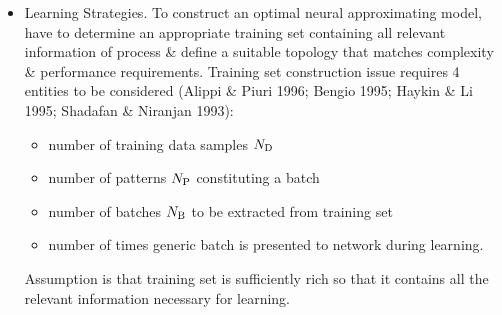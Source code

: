 \documentclass{article}
\begin{document}
\begin{enumerate}
\begin{itemize}
\begin{itemize}
\begin{itemize}
				{\bf Nonlinear transformations of data.} This method to transform data can help when dynamic range of data is too high. In the case, e.g., typically apply log function to input data. Log function is often applied in error \& objective functions for same purposes.
			\end{itemize}
			\item {\sf Learning Strategies.} To construct an optimal neural approximating model, have to determine an appropriate training set containing all relevant information of process \& define a suitable topology that matches complexity \& performance requirements. Training set construction issue requires 4 entities to be considered (Alippi \& Piuri 1996; Bengio 1995; Haykin \& Li 1995; Shadafan \& Niranjan 1993):
			\begin{itemize}
				\item number of training data samples $N_{\rm D}$
				\item number of patterns $N_{\rm P}$ constituting a batch
				\item number of batches $N_{\rm B}$ to be extracted from training set
				\item number of times generic batch is presented to network during learning.
			\end{itemize}
			Assumption is that training set is sufficiently rich so that it contains all the relevant information necessary for learning.
			

\end{itemize}
\end{itemize}
\end{enumerate}
\end{document}
